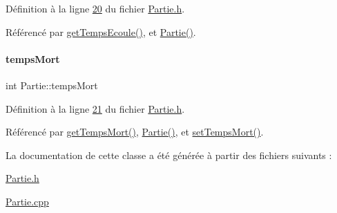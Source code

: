 Définition à la ligne \hyperlink{_partie_8h_source_l00020}{20} du fichier \hyperlink{_partie_8h_source}{Partie.\+h}.



Référencé par \hyperlink{_partie_8cpp_source_l00023}{get\+Temps\+Ecoule()}, et \hyperlink{_partie_8cpp_source_l00013}{Partie()}.

\mbox{\label{class_partie_a55a5e6e0b757d74fa9aceefa7228ead9}} 
\paragraph{\texorpdfstring{temps\+Mort}{tempsMort}}
{\footnotesize\ttfamily int Partie\+::temps\+Mort\hspace{0.3cm}{\ttfamily [private]}}



Définition à la ligne \hyperlink{_partie_8h_source_l00021}{21} du fichier \hyperlink{_partie_8h_source}{Partie.\+h}.



Référencé par \hyperlink{_partie_8cpp_source_l00033}{get\+Temps\+Mort()}, \hyperlink{_partie_8cpp_source_l00013}{Partie()}, et \hyperlink{_partie_8cpp_source_l00028}{set\+Temps\+Mort()}.



La documentation de cette classe a été générée à partir des fichiers suivants \+:\begin{DoxyCompactItemize}
\item 
\hyperlink{_partie_8h}{Partie.\+h}\item 
\hyperlink{_partie_8cpp}{Partie.\+cpp}\end{DoxyCompactItemize}
